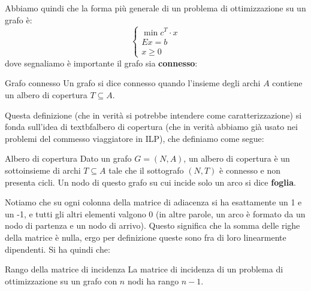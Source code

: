 \documentclass[a4paper,11pt]{article}
\begin{document}
\par\smallskip 

Abbiamo quindi che la forma più generale di un problema di ottimizzazione su un grafo è:
\[
	\begin{cases}
		\min c^T \cdot x \\ 
		Ex = b \\ 
		x \geq 0 
	\end{cases}
\]
dove segnaliamo è importante il grafo sia \textbf{connesso}:
\begin{definition}{Grafo connesso}
	Un grafo si dice connesso quando l'insieme degli archi $A$ contiene un albero di copertura $T \subseteq A$.
\end{definition}
Questa definizione (che in verità si potrebbe intendere come caratterizzazione) si fonda sull'idea di textbf{albero di copertura} (che in verità abbiamo già usato nei problemi del commesso viaggiatore in ILP), che definiamo come segue:
\begin{definition}{Albero di copertura}
	Dato un grafo $G = (N, A)$, un albero di copertura è un sottoinsieme di archi $T \subseteq A$ tale che il sottografo $(N, T)$ è connesso e non presenta cicli. Un nodo di questo grafo su cui incide solo un arco si dice \textbf{foglia}.
\end{definition}

Notiamo che su ogni colonna della matrice di adiacenza si ha esattamente un 1 e un -1, e tutti gli altri elementi valgono 0 (in altre parole, un arco è formato da un nodo di partenza e un nodo di arrivo).
Questo significa che la somma delle righe della matrice è nulla, ergo per definizione queste sono fra di loro linearmente dipendenti.
Si ha quindi che:
\begin{theorem}{Rango della matrice di incidenza}
	La matrice di incidenza di un problema di ottimizzazione su un grafo con $n$ nodi ha rango $n-1$.
\end{theorem}
\end{document}
